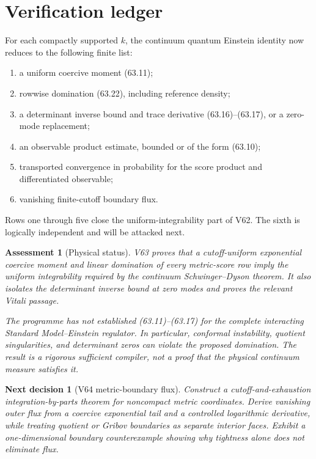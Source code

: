 \documentclass[11pt]{article}
\newtheorem{decision}[theorem]{Next decision}
\newtheorem{assessment}[theorem]{Assessment}
\theoremstyle{remark}
\begin{document}
\section{Verification ledger}

For each compactly supported \(k\), the continuum quantum Einstein
identity now reduces to the following finite list:
\begin{enumerate}
\item a uniform coercive moment (63.11);
\item rowwise domination (63.22), including reference density;
\item a determinant inverse bound and trace derivative
      (63.16)--(63.17), or a zero-mode replacement;
\item an observable product estimate, bounded or of the form
      (63.10);
\item transported convergence in probability for the score product
      and differentiated observable;
\item vanishing finite-cutoff boundary flux.
\end{enumerate}
Rows one through five close the uniform-integrability part of V62.
The sixth is logically independent and will be attacked next.

\begin{assessment}[Physical status]
\label{ass:v15v63-status}
V63 proves that a cutoff-uniform exponential coercive moment and
linear domination of every metric-score row imply the uniform
integrability required by the continuum Schwinger--Dyson theorem.
It also isolates the determinant inverse bound at zero modes and
proves the relevant Vitali passage.

The programme has not established (63.11)--(63.17) for the complete
interacting Standard Model--Einstein regulator.  In particular,
conformal instability, quotient singularities, and determinant
zeros can violate the proposed domination.  The result is a
rigorous sufficient compiler, not a proof that the physical
continuum measure satisfies it.
\end{assessment}

\begin{decision}[V64 metric-boundary flux]
\label{dec:v15v63-next}
Construct a cutoff-and-exhaustion integration-by-parts theorem for
noncompact metric coordinates.  Derive vanishing outer flux from a
coercive exponential tail and a controlled logarithmic derivative,
while treating quotient or Gribov boundaries as separate interior
faces.  Exhibit a one-dimensional boundary counterexample showing
why tightness alone does not eliminate flux.
\end{decision}
\end{document}
